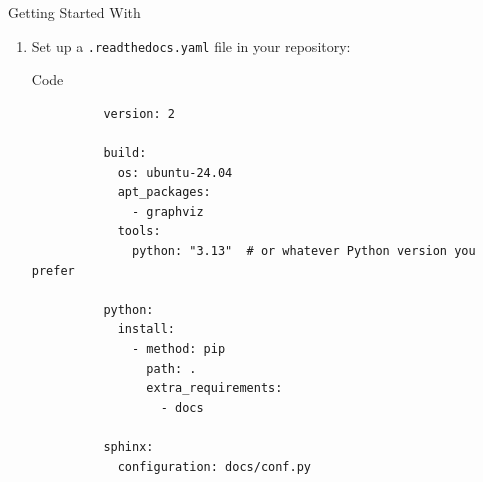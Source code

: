 \begin{frame}[fragile]{Getting Started With \rtd}
  \begin{enumerate}
    \item Set up a \texttt{.readthedocs.yaml} file in your repository:
      \begin{block}{Code}
        \begin{verbatim}
          version: 2

          build:
            os: ubuntu-24.04
            apt_packages:
              - graphviz
            tools:
              python: "3.13"  # or whatever Python version you prefer

          python:
            install:
              - method: pip
                path: .
                extra_requirements:
                  - docs

          sphinx:
            configuration: docs/conf.py
        \end{verbatim}
      \end{block}
  \end{enumerate}
\end{frame}

